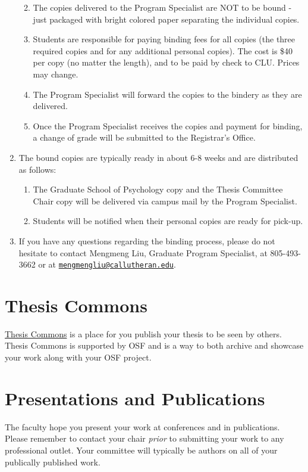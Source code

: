 \documentclass[openany]{book}
\providecommand{\tightlist}{%
  \setlength{\itemsep}{0pt}\setlength{\parskip}{0pt}}
\begin{document}
\begin{enumerate}
  \begin{enumerate}
  \def\labelenumii{\alph{enumii}.}
  \tightlist
  \item
    The copies delivered to the Program Specialist are NOT to be bound - just packaged with bright colored paper separating the individual copies.
  \item
    Students are responsible for paying binding fees for all copies (the three required copies and for any additional personal copies). The cost is \$40 per copy (no matter the length), and to be paid by check to CLU. Prices may change.
  \item
    The Program Specialist will forward the copies to the bindery as they are delivered.
  \item
    Once the Program Specialist receives the copies and payment for binding, a change of grade will be submitted to the Registrar's Office.
  \end{enumerate}
\item
  The bound copies are typically ready in about 6-8 weeks and are distributed as follows:

  \begin{enumerate}
  \def\labelenumii{\alph{enumii}.}
  \tightlist
  \item
    The Graduate School of Psychology copy and the Thesis Committee Chair copy will be delivered via campus mail by the Program Specialist.
  \item
    Students will be notified when their personal copies are ready for pick-up.
  \end{enumerate}
\item
  If you have any questions regarding the binding process, please do not hesitate to contact Mengmeng Liu, Graduate Program Specialist, at 805-493-3662 or at \href{mailto:mengmengliu@callutheran.edu}{\nolinkurl{mengmengliu@callutheran.edu}}.
\end{enumerate}

\hypertarget{thesis-commons}{%
\chapter{Thesis Commons}\label{thesis-commons}}

\href{https://thesiscommons.org/}{Thesis Commons} is a place for you publish your thesis to be seen by others. Thesis Commons is supported by OSF and is a way to both archive and showcase your work along with your OSF project.

\hypertarget{presentations-and-publications}{%
\chapter{Presentations and Publications}\label{presentations-and-publications}}

The faculty hope you present your work at conferences and in publications. Please remember to contact your chair \emph{prior} to submitting your work to any professional outlet. Your committee will typically be authors on all of your publically published work.


\end{document}
